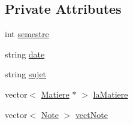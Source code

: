 \subsection*{Private Attributes}
\begin{DoxyCompactItemize}
\item 
int \hyperlink{class_evaluation_ae000ec143562ed56975018bf82b13b5c}{semestre}
\item 
string \hyperlink{class_evaluation_af97cdd68e574cc998f161f83c0f6b855}{date}
\item 
string \hyperlink{class_evaluation_a03ed74f0b6d6b28f3ac877312e3cbd8a}{sujet}
\item 
vector$<$ \hyperlink{class_matiere}{Matiere} $\ast$ $>$ \hyperlink{class_evaluation_a28a58ead557883cd0d51af79d2f2d42a}{la\+Matiere}
\item 
vector$<$ \hyperlink{class_note}{Note} $>$ \hyperlink{class_evaluation_ad26840cec05aea45af3b1164c55a7557}{vect\+Note}
\end{DoxyCompactItemize}


